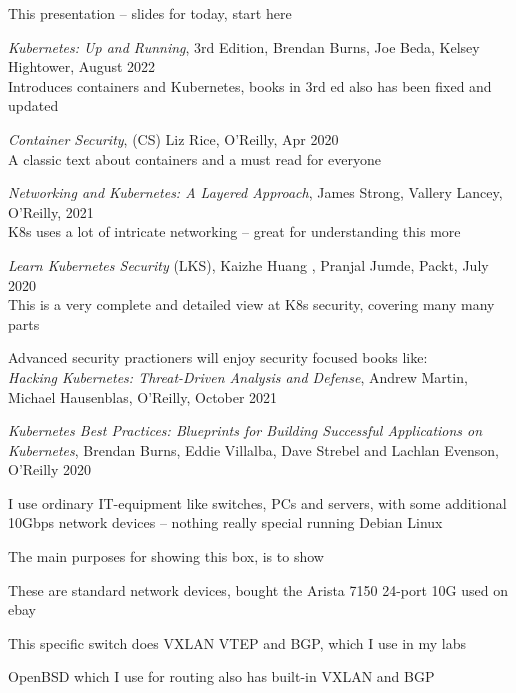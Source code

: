 \documentclass[Screen16to9,17pt]{foils}
\begin{document}
\begin{list2}
\item This presentation -- slides for today, start here
\item \emph{Kubernetes: Up and Running}, 3rd Edition, Brendan Burns, Joe Beda, Kelsey Hightower,
August 2022\\
Introduces containers and Kubernetes, books in 3rd ed also has been fixed and updated
\item \emph{Container Security}, (CS) Liz Rice, O'Reilly, Apr 2020\\
A classic text about containers and a must read for everyone
\item \emph{Networking and Kubernetes: A Layered Approach}, James Strong, Vallery Lancey, O'Reilly, 2021\\
K8s uses a lot of intricate networking -- great for understanding this more
\item \emph{Learn Kubernetes Security} (LKS), Kaizhe Huang , Pranjal Jumde, Packt, July 2020\\
This is a very complete and detailed view at K8s security, covering many many parts
\item Advanced security practioners will enjoy security focused books like:\\
\emph{Hacking Kubernetes: Threat-Driven Analysis and Defense}, Andrew Martin, Michael Hausenblas, O'Reilly, October 2021
\item \emph{Kubernetes Best Practices: Blueprints for Building Successful Applications on Kubernetes}, Brendan Burns, Eddie Villalba, Dave Strebel and Lachlan Evenson, O'Reilly 2020
\end{list2}



I use ordinary IT-equipment like switches, PCs and servers, with some additional 10Gbps network devices -- nothing really special running Debian Linux

The main purposes for showing this box, is to show
\begin{list2}
\item These are standard network devices, bought the Arista 7150 24-port 10G used on ebay
\item This specific switch does VXLAN VTEP and BGP, which I use in my labs
\item OpenBSD which I use for routing also has built-in VXLAN and BGP
\end{list2}
\end{document}
